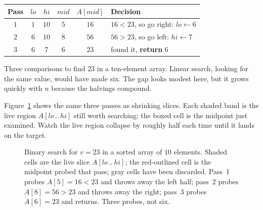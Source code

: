 \begin{center}
\begin{tabular}{c c c c c l}
\toprule
Pass & $lo$ & $hi$ & $mid$ & $A[mid]$ & Decision \\
\midrule
$1$ & $1$ & $10$ & $5$ & $16$ & $16 < 23$, so go right: $lo \gets 6$ \\
$2$ & $6$ & $10$ & $8$ & $56$ & $56 > 23$, so go left: $hi \gets 7$ \\
$3$ & $6$ & $7$  & $6$ & $23$ & found it, \textbf{return} $6$ \\
\bottomrule
\end{tabular}
\end{center}

Three comparisons to find $23$ in a ten-element array. Linear search, looking for the
same value, would have made six. The gap looks modest here, but it grows quickly
with $n$ because the halvings compound.

Figure~\ref{ch01:binary-halving} shows the same three passes as shrinking slices.
Each shaded band is the live region $A[lo\,..\,hi]$ still worth searching; the boxed
cell is the midpoint just examined. Watch the live region collapse by roughly half
each time until it lands on the target.

\begin{figure}[H]
\centering
{}
\caption{Binary search for $v = 23$ in a sorted array of $10$ elements. Shaded cells
are the live slice $A[lo\,..\,hi]$; the red-outlined cell is the midpoint probed that
pass; gray cells have been discarded. Pass~1 probes $A[5]=16<23$ and throws away the
left half; pass~2 probes $A[8]=56>23$ and throws away the right; pass~3 probes
$A[6]=23$ and returns. Three probes, not six.}
\label{ch01:binary-halving}
\end{figure}

